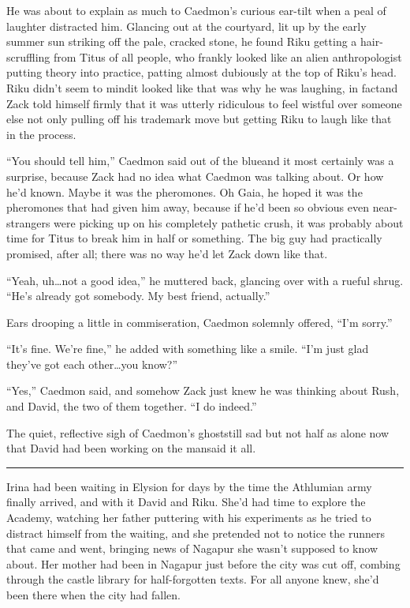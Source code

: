 He was about to explain as much to Caedmon's curious ear-tilt when a peal of laughter distracted him. Glancing out at the courtyard, lit up by the early summer sun striking off the pale, cracked stone, he found Riku getting a hair-scruffling from Titus of all people, who frankly looked like an alien anthropologist putting theory into practice, patting almost dubiously at the top of Riku's head. Riku didn't seem to mind\textemdash it looked like that was why he was laughing, in fact\textemdash and Zack told himself firmly that it was utterly ridiculous to feel wistful over someone else not only pulling off his trademark move but getting Riku to laugh like that in the process.

``You should tell him,'' Caedmon said out of the blue\textemdash and it most certainly was a surprise, because Zack had no idea what Caedmon was talking about. Or how he'd known. Maybe it was the pheromones. Oh Gaia, he hoped it was the pheromones that had given him away, because if he'd been so obvious even near-strangers were picking up on his completely pathetic crush, it was probably about time for Titus to break him in half or something. The big guy had practically promised, after all; there was no way he'd let Zack down like that.

``Yeah, uh\ldots not a good idea,'' he muttered back, glancing over with a rueful shrug. ``He's already got somebody. My best friend, actually.''

Ears drooping a little in commiseration, Caedmon solemnly offered, ``I'm sorry.''

``It's fine. We're fine,'' he added with something like a smile. ``I'm just glad they've got each other\ldots you know?''

``Yes,'' Caedmon said, and somehow Zack just knew he was thinking about Rush, and David, the two of them together. ``I do indeed.''

The quiet, reflective sigh of Caedmon's ghost\textemdash still sad but not half as alone now that David had been working on the man\textemdash said it all.

\fancybreak{\pfbreakdisplay}


Irina had been waiting in Elysion for days by the time the Athlumian army finally arrived, and with it David and Riku. She'd had time to explore the Academy, watching her father puttering with his experiments as he tried to distract himself from the waiting, and she pretended not to notice the runners that came and went, bringing news of Nagapur she wasn't supposed to know about. Her mother had been in Nagapur just before the city was cut off, combing through the castle library for half-forgotten texts. For all anyone knew, she'd been there when the city had fallen.

